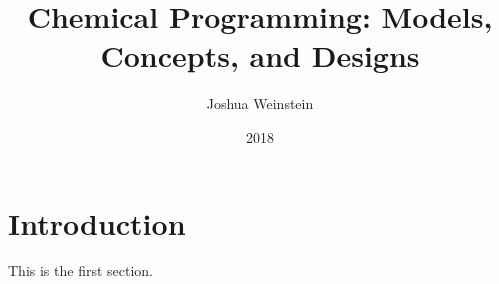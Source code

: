 \documentclass{article}
\title{Chemical Programming: Models, Concepts, and Designs}
\author{Joshua Weinstein}
\date{2018}
\begin{document}
\maketitle

\newpage

\tableofcontents

\newpage

\section{Introduction}

This is the first section.
\end{document}
